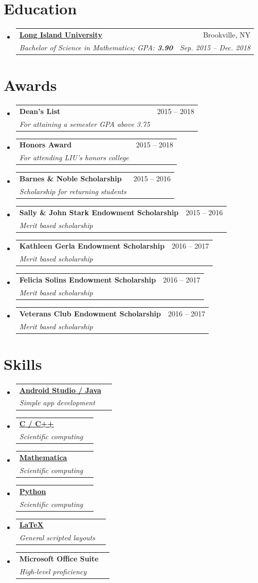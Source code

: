 \documentclass[letterpaper,11pt]{article}
\makeatletter
\newcommand{\TwoRowSubheading}[4]{
	\item\vspace{-5pt}
		\begin{tabular*}{.97\textwidth}{l @{\extracolsep{\fill}} r}
			\textbf{#1} & #2 \\
			\textit{\small #3} & \textit{\small #4} \\
		\end{tabular*}\vspace{-5pt}
}
\makeatother
\begin{document}
\section{Education}
	\begin{itemize}[leftmargin=*]
		\TwoRowSubheading
			{\href{http://liu.edu/post}{Long Island University}}{Brookville, NY}
			{Bachelor of Science in Mathematics;  GPA: \textbf{3.90}}{Sep. 2015 -- Dec. 2018}
	\end{itemize}



\section{Awards}
	\begin{itemize}[leftmargin=*]
		\TwoRowSubheading
			{Dean's List}{2015 -- 2018}{For attaining a semester GPA above 3.75}{}
		\TwoRowSubheading
			{Honors Award}{2015 -- 2018}{For attending LIU's honors college}{}
		\TwoRowSubheading
			{Barnes \& Noble Scholarship}{2015 -- 2016}{Scholarship for returning students}{}
		\TwoRowSubheading
			{Sally \& John Stark Endowment Scholarship}{2015 -- 2016}{Merit based scholarship}{}
		\TwoRowSubheading
			{Kathleen Gerla Endowment Scholarship}{2016 -- 2017}{Merit based scholarship}{}
		\TwoRowSubheading
			{Felicia Solins Endowment Scholarship}{2016 -- 2017}{Merit based scholarship}{}
		\TwoRowSubheading
			{Veterans Club Endowment Scholarship}{2016 -- 2017}{Merit based scholarship}{}
	\end{itemize}



\section{Skills}
	\vspace*{-15pt}\begin{multicols}{3}
		\begin{itemize}[leftmargin=*]
			\TwoRowSubheading
				{\href{http://github.com/seanwevans/mycv}{Android Studio / Java}}{}
				{Simple app development}{}
			\TwoRowSubheading
				{\href{http://github.com/seanwevans/odesolver}{C / C++}}{}
				{Scientific computing}{}
			\TwoRowSubheading
				{\href{http://github.com/seanwevans/randommathematica}{Mathematica}}{}
				{Scientific computing}{}
			\TwoRowSubheading
				{\href{http://github.com/seanwevans/randompython}{Python}}{}
				{Scientific computing}{}
			\TwoRowSubheading
				{\href{http://github.com/seanwevans/massenv}{\LaTeX}}{}
				{General scripted layouts}{}
			\TwoRowSubheading
				{Microsoft Office Suite}{}
				{High-level proficiency}{}
			\end{itemize}
	\end{multicols}
	
\end{document}
